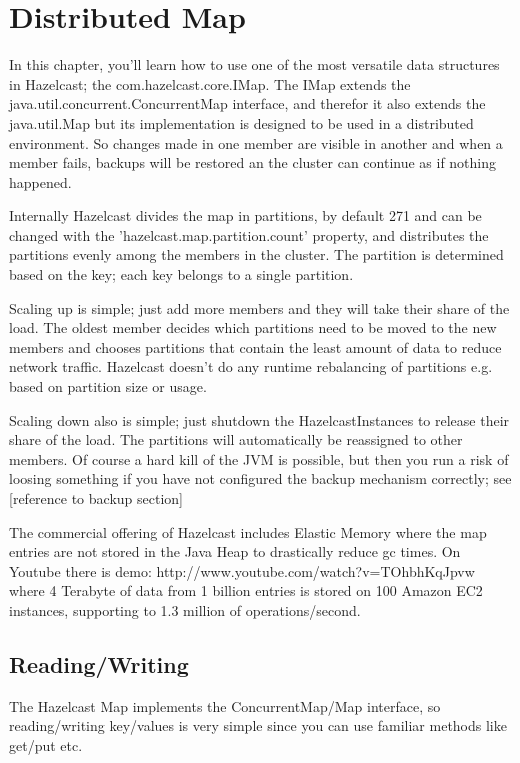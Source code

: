 \chapter{Distributed Map}
In this chapter, you'll learn how to use one of the most versatile data structures in Hazelcast; the com.hazelcast.core.IMap. The IMap extends the java.util.concurrent.ConcurrentMap interface, and therefor it also extends the java.util.Map but its implementation is designed to be used in a distributed environment. So changes made in one member are visible in another and when a member fails, backups will be restored an the cluster can continue as if nothing happened.

Internally Hazelcast divides the map in partitions, by default 271 and can be changed with the 'hazelcast.map.partition.count' property, and distributes the partitions evenly among the members in the cluster. The partition is determined based on the key; each key belongs to a single partition. 

Scaling up is simple; just add more members and they will take their share of the load. The oldest member decides which partitions need to be moved to the new members and chooses partitions that contain the least amount of data to reduce network traffic. Hazelcast doesn't do any runtime rebalancing of partitions e.g. based on partition size or usage. 

Scaling down also is simple; just shutdown the HazelcastInstances to release their share of the load. The partitions will automatically be reassigned to other members. Of course a hard kill of the JVM is possible, but then you run a risk of loosing something if you have not configured the backup mechanism correctly; see [reference to backup section]

The commercial offering of Hazelcast includes Elastic Memory where the map entries are not stored in the Java Heap to drastically reduce gc times. On Youtube there is demo: http://www.youtube.com/watch?v=TOhbhKqJpvw where 4 Terabyte of data from 1 billion entries is stored on 100 Amazon EC2 instances, supporting to 1.3 million of operations/second.

\section{Reading/Writing}
The Hazelcast Map implements the ConcurrentMap/Map interface, so reading/writing key/values is very simple since you can use familiar methods like get/put etc. 

